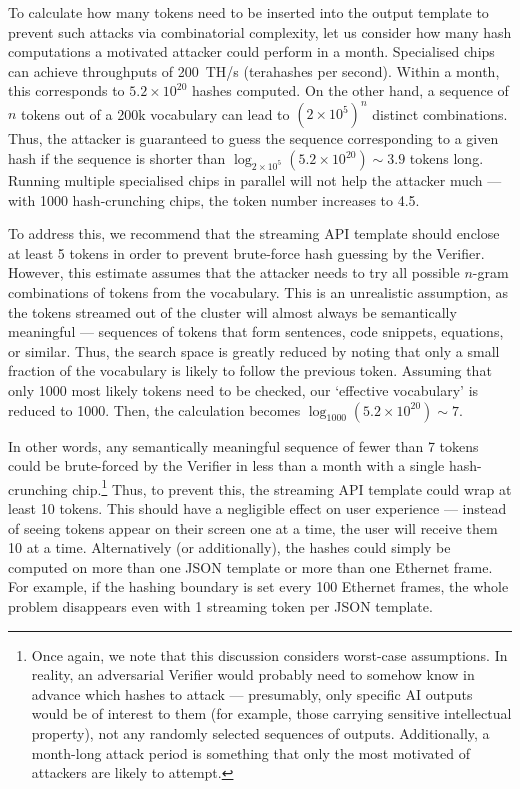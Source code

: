 \documentclass{article}
\begin{document}
To calculate how many tokens need to be inserted into the output template to prevent such attacks via combinatorial complexity, let us consider how many hash computations a motivated attacker could perform in a month. Specialised chips can achieve throughputs of 200~TH/s (terahashes per second). Within a month, this corresponds to $5.2 \times 10^{20}$ hashes computed. On the other hand, a sequence of $n$ tokens out of a 200k vocabulary can lead to $(2 \times 10^5)^n$ distinct combinations. Thus, the attacker is guaranteed to guess the sequence corresponding to a given hash if the sequence is shorter than $\log_{2 \times 10^5}(5.2 \times 10^{20}) \sim 3.9$ tokens long. Running multiple specialised chips in parallel will not help the attacker much --- with 1000 hash-crunching chips, the token number increases to 4.5.

To address this, we recommend that the streaming API template should enclose at least 5 tokens in order to prevent brute-force hash guessing by the Verifier. However, this estimate assumes that the attacker needs to try all possible $n$-gram combinations of tokens from the vocabulary. This is an unrealistic assumption, as the tokens streamed out of the cluster will almost always be semantically meaningful --- sequences of tokens that form sentences, code snippets, equations, or similar. Thus, the search space is greatly reduced by noting that only a small fraction of the vocabulary is likely to follow the previous token. Assuming that only 1000 most likely tokens need to be checked, our `effective vocabulary' is reduced to 1000. Then, the calculation becomes $\log_{1000}(5.2 \times 10^{20}) \sim 7$.

In other words, any semantically meaningful sequence of fewer than 7 tokens could be brute-forced by the Verifier in less than a month with a single hash-crunching chip.\footnote{Once again, we note that this discussion considers worst-case assumptions. In reality, an adversarial Verifier would probably need to somehow know in advance which hashes to attack --- presumably, only specific AI outputs would be of interest to them (for example, those carrying sensitive intellectual property), not any randomly selected sequences of outputs. Additionally, a month-long attack period is something that only the most motivated of attackers are likely to attempt.} Thus, to prevent this, the streaming API template could wrap at least 10 tokens. This should have a negligible effect on user experience --- instead of seeing tokens appear on their screen one at a time, the user will receive them 10 at a time. Alternatively (or additionally), the hashes could simply be computed on more than one JSON template or more than one Ethernet frame. For example, if the hashing boundary is set every 100 Ethernet frames, the whole problem disappears even with 1 streaming token per JSON template.
\end{document}
